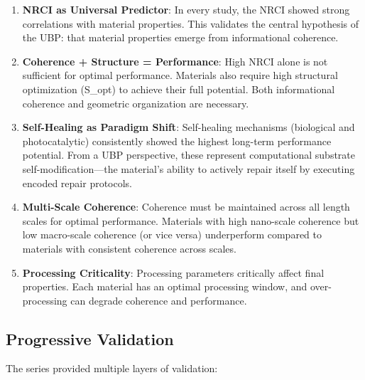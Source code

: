 \documentclass[11pt,a4paper]{article}
\begin{document}
\begin{enumerate}
    \item \textbf{NRCI as Universal Predictor}: In every study, the NRCI showed strong correlations with material properties. This validates the central hypothesis of the UBP: that material properties emerge from informational coherence.
    
    \item \textbf{Coherence + Structure = Performance}: High NRCI alone is not sufficient for optimal performance. Materials also require high structural optimization (S\_opt) to achieve their full potential. Both informational coherence and geometric organization are necessary.
    
    \item \textbf{Self-Healing as Paradigm Shift}: Self-healing mechanisms (biological and photocatalytic) consistently showed the highest long-term performance potential. From a UBP perspective, these represent computational substrate self-modification—the material's ability to actively repair itself by executing encoded repair protocols.
    
    \item \textbf{Multi-Scale Coherence}: Coherence must be maintained across all length scales for optimal performance. Materials with high nano-scale coherence but low macro-scale coherence (or vice versa) underperform compared to materials with consistent coherence across scales.
    
    \item \textbf{Processing Criticality}: Processing parameters critically affect final properties. Each material has an optimal processing window, and over-processing can degrade coherence and performance.
\end{enumerate}

\subsection{Progressive Validation}

The series provided multiple layers of validation:
\end{document}

